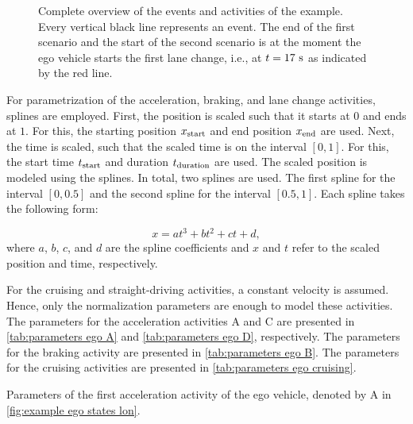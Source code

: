 \documentclass[10pt,final,a4paper,oneside,onecolumn]{article}
\newlength\figurewidth
\newlength\figureheight
\theoremstyle{plain}\newtheorem{definition}{Definition}[section]    %
\theoremstyle{definition}\newtheorem{example}{Example}[section]     %
\theoremstyle{remark}\newtheorem{remarkenv}{Remark}[section]        %
\begin{document}
\begin{figure}
	\centering
	\setlength\figureheight{170pt}
	\setlength\figurewidth{\linewidth}
	\caption{Complete overview of the events and activities of the example. Every vertical black line represents an event. The end of the first scenario and the start of the second scenario is at the moment the ego vehicle starts the first lane change, i.e., at $t=17\ \textup{s}$ as indicated by the red line.}
	\label{fig:example events}
\end{figure}

For parametrization of the acceleration, braking, and lane change activities, splines are employed. First, the position is scaled such that it starts at $0$ and ends at $1$. For this, the starting position $x_{\textup{start}}$ and end position $x_{\textup{end}}$ are used. Next, the time is scaled, such that the scaled time is on the interval $[0, 1]$. For this, the start time $t_{\textup{start}}$ and duration $t_{\textup{duration}}$ are used. The scaled position is modeled using the splines. In total, two splines are used. The first spline for the interval $[0, 0.5]$ and the second spline for the interval $[0.5, 1]$. Each spline takes the following form:

\begin{equation}
	x = at^3 + bt^2 + ct + d,
\end{equation}
where $a$, $b$, $c$, and $d$ are the spline coefficients and $x$ and $t$ refer to the scaled position and time, respectively. 

For the cruising and straight-driving activities, a constant velocity is assumed. Hence, only the normalization parameters are enough to model these activities. The parameters for the acceleration activities A and C are presented in \cref{tab:parameters ego A} and \cref{tab:parameters ego D}, respectively. The parameters for the braking activity are presented in \cref{tab:parameters ego B}. The parameters for the cruising activities are presented in \cref{tab:parameters ego cruising}.

\begin{table}
	\centering
	\caption{Parameters of the first acceleration activity of the ego vehicle, denoted by A in \cref{fig:example ego states lon}.}
	\label{tab:parameters ego A}
	\begin{minipage}[b]{.33\linewidth}
		\centering
	\end{minipage}%
	\begin{minipage}[b]{.5\linewidth}
		\centering
	\end{minipage}%
\end{table}
\end{document}
